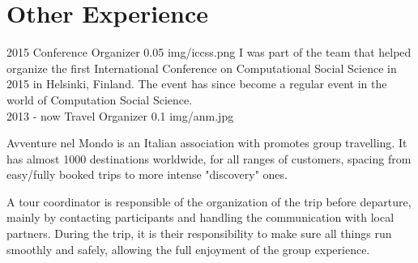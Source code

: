\documentclass[]{friggeri-cv}
\begin{document}
\section{Other Experience}

\begin{entrylist}

\work
{2015}
{Conference Organizer}
{0.05}
{img/iccss.png}
{I was part of the team that helped organize the first International Conference on Computational Social Science in 2015 in Helsinki, Finland. The event has since become a regular event in the world of Computation Social Science.
}
\\

\work
{2013 - now}
{Travel Organizer}
{0.1}
{img/anm.jpg}
{Avventure nel Mondo is an Italian association with promotes group travelling. It has almost 1000 destinations worldwide, for all ranges of customers, spacing from easy/fully booked trips to more intense "discovery" ones.

A tour coordinator is responsible of the organization of the trip before departure, mainly by contacting participants and handling the communication with local partners. During the trip, it is their responsibility to make sure all things run smoothly and safely, allowing the full enjoyment of the group experience.}


\end{entrylist}
\end{document}
